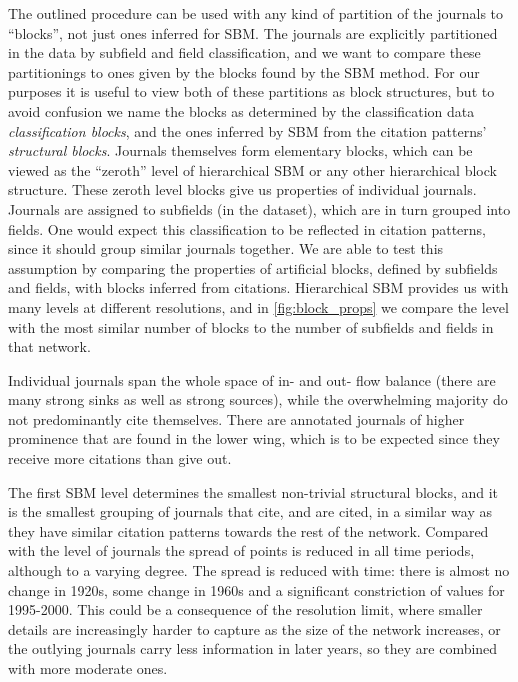 \documentclass[a4paper,12pt]{article}
\begin{document}
The outlined procedure can be used with any kind of partition of the journals to ``blocks'', not just ones inferred 
for SBM. 
The journals are explicitly partitioned in the data by subfield and field classification, and
we want to compare these partitionings to ones given by the blocks found by the SBM method.
For our purposes it is useful to view both of these partitions as block structures,
but to avoid confusion
we name the blocks as determined by the classification data \emph{classification blocks}, 
and the ones inferred by SBM from the citation patterns' \emph{structural blocks}.
Journals themselves form elementary blocks, which can be viewed as 
the ``zeroth'' level of hierarchical SBM or any other hierarchical block structure.
These zeroth level blocks give us properties of individual journals.
Journals are assigned to subfields (in the dataset), which are in turn grouped into 
fields. One would expect this classification to be reflected in citation patterns, 
since it should group similar journals together. We are able to test this assumption by comparing the properties of artificial blocks, 
defined by subfields and fields, with blocks inferred from citations. Hierarchical SBM 
provides us with many levels at different resolutions, and in \cref{fig:block_props} 
we compare the level
with the most similar number of blocks to the number of subfields and fields in that network.

Individual journals span the whole space of in- and out- flow balance (there are many
strong sinks as well as strong sources),
while the overwhelming majority do not predominantly 
cite themselves. There are annotated journals of higher prominence that are found in the lower wing, which is to be expected since
they receive more citations than give out.

The first SBM level determines the smallest non-trivial structural blocks,
and it is the smallest grouping of journals that cite, and are cited, 
in a similar way as they have similar citation patterns towards the rest of the network. 
Compared with the level of journals the spread of points is reduced in all time periods, 
although to a varying degree. The spread is reduced with time: there is almost no 
change in 1920s, some change in 1960s and a significant constriction of values for 1995-2000. This could be a consequence of the resolution limit, where smaller details are
increasingly harder to capture as the size of the network increases, or the outlying journals
carry less information in later years, so they are combined with more moderate ones.
\end{document}
